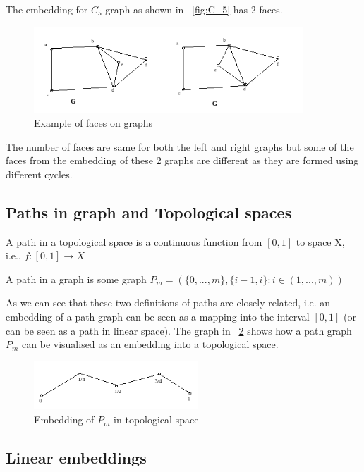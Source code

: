 \documentclass{article}
\begin{document}
The embedding for $C_5$ graph as shown in ~\ref{fig:C_5} has 2 faces.

\begin{figure}[h]
    \centering
    \includegraphics[width=0.9\textwidth]{images/fig2-12.png}
    \caption{Example of faces on graphs}
    \label{fig:fig2-12}
\end{figure}

The number of faces are same for both the left and right graphs but some of the faces from the embedding of these 2 graphs are different as they are formed using different cycles.

\subsection{Paths in graph and Topological spaces}

A path in a topological space is a continuous function from $[0,1]$ to space X, i.e., $f:[0,1] \longrightarrow X$

A path in a graph is some graph $P_m = (\{0,...,m\},\{i-1,i\} : i \in (1,...,m))$

As we can see that these two definitions of paths are closely related, i.e. an embedding of a path graph can be seen as a mapping into the interval $[0,1]$ (or can be seen as a path in linear space). The graph in ~\ref{fig:fig3-12} shows how a path graph $P_m$ can be visualised as an embedding into a topological space.

\begin{figure}[h]
    \centering
    \includegraphics[width=0.55\textwidth]{images/fig3-12.png}
    \caption{Embedding of $P_m$ in topological space}
    \label{fig:fig3-12}
\end{figure}

\subsection{Linear embeddings}
\end{document}
